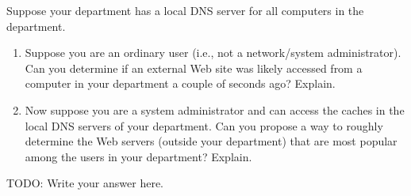 \documentclass{report}
\begin{document}
\newpage
\begin{problem}
Suppose your department has a local DNS server for all computers in the department.

\begin{enumerate}
\item Suppose you are an ordinary user (i.e., not a network/system administrator). Can you determine if an external Web site was likely accessed from a computer in your department a couple of seconds ago? Explain.

\item Now suppose you are a system administrator and can access the caches in the local DNS servers of your department. Can you propose a way to roughly determine the Web servers (outside your department) that are most popular among the users in your department? Explain.
\end{enumerate}

  \begin{answer}{40em}
  	TODO: Write your answer here.
  \end{answer}

\end{problem}
\end{document}
